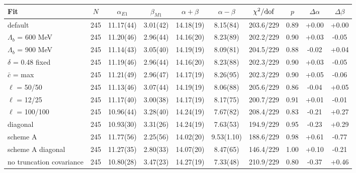 \begin{tabular}{lccccccccc}
\hline
Fit & $N$ & $\alpha_{E1}$ & $\beta_{M1}$ & $\alpha+\beta$ & $\alpha-\beta$ & $\chi^2/{\rm dof}$ & $p$ & $\Delta\alpha$ & $\Delta\beta$ \\
\hline
default & 245 & 11.17(44) & 3.01(42) & 14.18(19) & 8.15(84) & 203.6/229 & 0.89 & +0.00 & +0.00 \\
$\Lambda_b$ = 600 MeV & 245 & 11.20(46) & 2.96(44) & 14.16(20) & 8.23(89) & 202.2/229 & 0.90 & +0.03 & -0.05 \\
$\Lambda_b$ = 900 MeV & 245 & 11.14(43) & 3.05(40) & 14.19(19) & 8.09(81) & 204.5/229 & 0.88 & -0.02 & +0.04 \\
$\delta$ = 0.48 fixed & 245 & 11.19(46) & 2.96(44) & 14.16(20) & 8.23(88) & 202.3/229 & 0.90 & +0.03 & -0.05 \\
$\bar c$ = max & 245 & 11.21(49) & 2.96(47) & 14.17(19) & 8.26(95) & 202.3/229 & 0.90 & +0.05 & -0.06 \\
$\ell$ = 50/50 & 245 & 11.13(46) & 3.07(44) & 14.19(19) & 8.06(88) & 205.6/229 & 0.86 & -0.04 & +0.05 \\
$\ell$ = 12/25 & 245 & 11.17(40) & 3.00(38) & 14.17(19) & 8.17(75) & 200.7/229 & 0.91 & +0.01 & -0.01 \\
$\ell$ = 100/100 & 245 & 10.96(44) & 3.28(40) & 14.24(19) & 7.67(82) & 208.4/229 & 0.83 & -0.21 & +0.27 \\
diagonal & 245 & 10.93(30) & 3.31(26) & 14.24(19) & 7.63(53) & 194.9/229 & 0.95 & -0.23 & +0.29 \\
scheme A & 245 & 11.77(56) & 2.25(56) & 14.02(20) & 9.53(1.10) & 188.6/229 & 0.98 & +0.61 & -0.77 \\
scheme A diagonal & 245 & 11.27(35) & 2.80(33) & 14.07(20) & 8.47(65) & 146.4/229 & 1.00 & +0.10 & -0.21 \\
no truncation covariance & 245 & 10.80(28) & 3.47(23) & 14.27(19) & 7.33(48) & 210.9/229 & 0.80 & -0.37 & +0.46 \\
\hline
\end{tabular}

